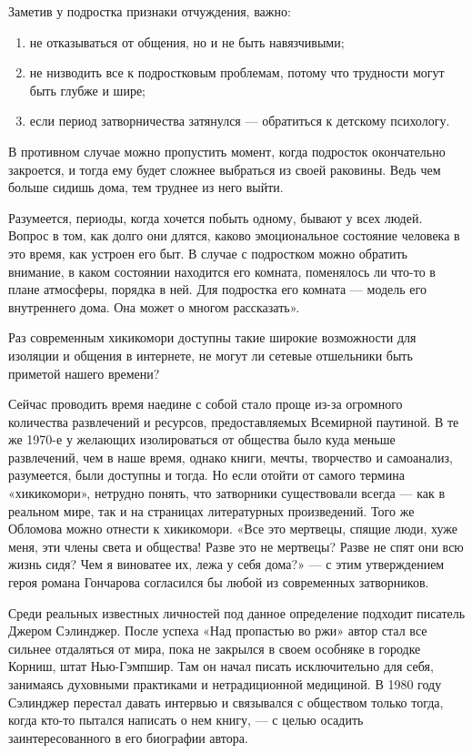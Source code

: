 Заметив у подростка признаки отчуждения, важно:
\begin{enumerate}
    \item не отказываться от общения, но и не быть навязчивыми;
    \item не низводить все к подростковым проблемам, потому что трудности могут быть глубже и шире;
    \item если период затворничества затянулся — обратиться к детскому психологу.
\end{enumerate}

В противном случае можно пропустить момент, когда подросток окончательно закроется, и тогда ему будет сложнее выбраться из своей раковины. Ведь чем больше сидишь дома, тем труднее из него выйти.

Разумеется, периоды, когда хочется побыть одному, бывают у всех людей. Вопрос в том, как долго они длятся, каково эмоциональное состояние человека в это время, как устроен его быт. В случае с подростком можно обратить внимание, в каком состоянии находится его комната, поменялось ли что-то в плане атмосферы, порядка в ней. Для подростка его комната — модель его внутреннего дома. Она может о многом рассказать».

\setlength{\leftskip}{0cm}

Раз современным хикикомори доступны такие широкие возможности для изоляции и общения в интернете, не могут ли сетевые отшельники быть приметой нашего времени?

Сейчас проводить время наедине с собой стало проще из-за огромного количества развлечений и ресурсов, предоставляемых Всемирной паутиной. В те же 1970-е у желающих изолироваться от общества было куда меньше развлечений, чем в наше время, однако книги, мечты, творчество и самоанализ, разумеется, были доступны и тогда. Но если отойти от самого термина «хикикомори», нетрудно понять, что затворники существовали всегда — как в реальном мире, так и на страницах литературных произведений. Того же Обломова можно отнести к хикикомори. «Все это мертвецы, спящие люди, хуже меня, эти члены света и общества! Разве это не мертвецы? Разве не спят они всю жизнь сидя? Чем я виноватее их, лежа у себя дома?» — с этим утверждением героя романа Гончарова согласился бы любой из современных затворников.

Среди реальных известных личностей под данное определение подходит писатель Джером Сэлинджер. После успеха «Над пропастью во ржи» автор стал все сильнее отдаляться от мира, пока не закрылся в своем особняке в городке Корниш, штат Нью-Гэмпшир. Там он начал писать исключительно для себя, занимаясь духовными практиками и нетрадиционной медициной. В 1980 году Сэлинджер перестал давать интервью и связывался с обществом только тогда, когда кто-то пытался написать о нем книгу, — с целью осадить заинтересованного в его биографии автора.

